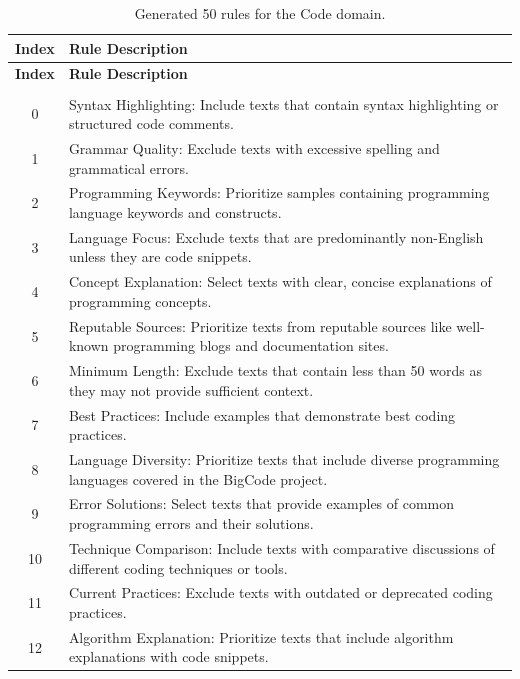 \documentclass{article}
\newcommand{\mytiny}{\fontsize{8pt}{10pt}\selectfont}
\begin{document}
\begingroup
\mytiny
\begin{longtable}{c|p{14cm}} %
\hline
\textbf{Index} & \textbf{Rule Description} \\
\hline
\endfirsthead

\hline
\textbf{Index} & \textbf{Rule Description} \\
\hline
\endhead

\hline
\endfoot

\caption{Generated 50 rules for the Code domain.} \label{tab:rules_for_code} \\
\endlastfoot

0 & Syntax Highlighting: Include texts that contain syntax highlighting or structured code comments. \\
\hline
1 & Grammar Quality: Exclude texts with excessive spelling and grammatical errors. \\
\hline
2 & Programming Keywords: Prioritize samples containing programming language keywords and constructs. \\
\hline
3 & Language Focus: Exclude texts that are predominantly non-English unless they are code snippets. \\
\hline
4 & Concept Explanation: Select texts with clear, concise explanations of programming concepts. \\
\hline
5 & Reputable Sources: Prioritize texts from reputable sources like well-known programming blogs and documentation sites. \\
\hline
6 & Minimum Length: Exclude texts that contain less than 50 words as they may not provide sufficient context. \\
\hline
7 & Best Practices: Include examples that demonstrate best coding practices. \\
\hline
8 & Language Diversity: Prioritize texts that include diverse programming languages covered in the BigCode project. \\
\hline
9 & Error Solutions: Select texts that provide examples of common programming errors and their solutions. \\
\hline
10 & Technique Comparison: Include texts with comparative discussions of different coding techniques or tools. \\
\hline
11 & Current Practices: Exclude texts with outdated or deprecated coding practices. \\
\hline
12 & Algorithm Explanation: Prioritize texts that include algorithm explanations with code snippets. \\
\hline

\end{longtable}
\end{document}
